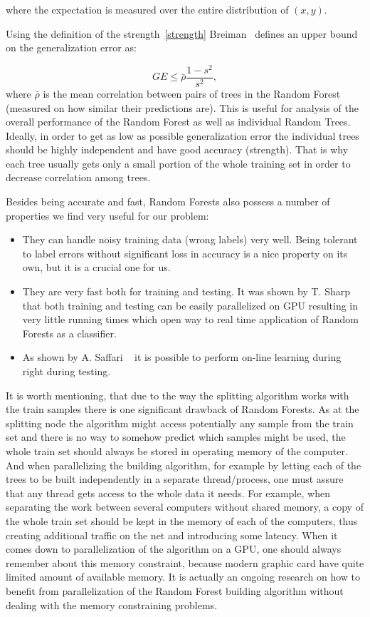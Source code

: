 where the expectation is measured over the entire distribution of $ (x, y) $.

Using the definition of the strength~\eqref{strength} Breiman~\cite{Breiman2001} defines an upper bound on the 
generalization error as:

\begin{equation}
 GE \leq \bar{\rho}\frac{1 - s^2}{s^2},
\end{equation}
where $\bar{\rho}$ is the mean correlation between pairs of trees in the Random Forest (measured on how similar their
predictions are). This is useful for analysis of the overall performance of the Random Forest as well as individual 
Random Trees. Ideally, in order to get as low as possible generalization error the individual trees should be highly 
independent and have good accuracy (strength). That is why each tree usually gets only a small portion of the whole training 
set in order to decrease correlation among trees.

Besides being accurate and fast, Random Forests also possess a number of
properties we find very useful for our problem:
\begin{itemize}
 \item They can handle noisy training data (wrong labels) very well. Being
tolerant to label
errors without significant loss in accuracy is a nice property on its own, but
it is a crucial one for us.
 \item They are very fast both for training and testing. It was shown by T.
Sharp~\cite{Sharp2008} that both training and testing can be easily parallelized on GPU
resulting in very little running times which open way to real time application
of Random Forests as a classifier.
 \item As shown by A. Saffari \etal~\cite{Saffari2009} it is possible to perform
on-line learning during right during testing.
\end{itemize}

It is worth mentioning, that due to the way the splitting algorithm works with the train samples there is one significant
drawback of Random Forests. As at the splitting node the algorithm might access potentially any sample from the train set
and there is no way to somehow predict which samples might be used, the whole train set should always be stored in operating
memory of the computer. And when parallelizing the building algorithm, for example by letting each of the trees to be built
independently in a separate thread/process, one must assure that any thread gets access to the whole data it needs. For example,
when separating the work between several computers without shared memory, a copy of the whole train set should be kept in the
memory of each of the computers, thus creating additional traffic on the net and introducing some latency. When it comes
down to parallelization of the algorithm on a GPU, one should always remember about this memory constraint, because modern
graphic card have quite limited amount of available memory. It is actually an ongoing research on how to benefit from
parallelization of the Random Forest building algorithm without dealing with the memory constraining problems.

